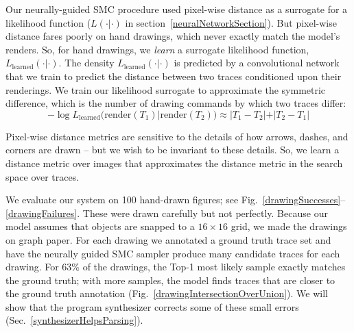 \documentclass{article}
\theoremstyle{definition}
\begin{document}
Our neurally-guided SMC procedure
used pixel-wise distance as a surrogate for a likelihood function ($L(\cdot|\cdot)$ in section~\ref{neuralNetworkSection}).
But pixel-wise distance fares poorly on hand drawings, which never exactly match
the model's renders.
So, for hand drawings,
we \emph{learn} a surrogate likelihood function,
$L_{\text{learned}}(\cdot|\cdot)$.
The density $L_{\text{learned}}(\cdot|\cdot)$ is predicted by a convolutional network that we train to predict
the distance between two traces conditioned upon their renderings.
We train our likelihood surrogate to approximate the symmetric difference,
which is  the number of drawing commands by which two traces differ:
  \begin{equation}
    -\log L_{\text{learned}}(\text{render}(T_1)|\text{render}(T_2))\approx |T_1 - T_2| + |T_2 - T_1|\label{symmetricDistance}
    \end{equation}



Pixel-wise
distance
metrics are sensitive to the details of how
arrows, dashes, and corners are drawn -- but we wish to be invariant
to these details.
So, we learn a distance metric over images that
approximates the distance metric in the search space over traces.


We evaluate our system on 100 hand-drawn figures; see Fig.~\ref{drawingSuccesses}--\ref{drawingFailures}.
These were drawn carefully but not perfectly.
Because our model assumes that objects are snapped to a $16\times 16$ grid, 
we made the drawings on graph paper.
For each drawing we annotated a ground truth trace set and have the neurally guided SMC sampler
produce many candidate traces for each drawing.
For 63\% of the drawings, the Top-1 most likely sample exactly matches the
ground truth; with more samples, the model finds traces
that are closer to the ground truth annotation (Fig.~\ref{drawingIntersectionOverUnion}).
We will show that the program synthesizer
corrects some of these small errors (Sec.~\ref{synthesizerHelpsParsing}).

\end{document}
